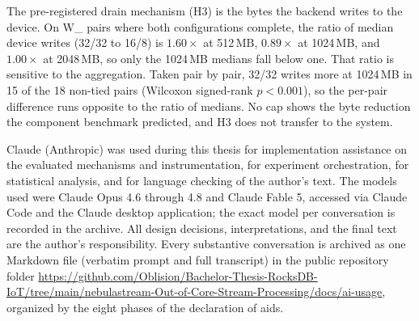 The pre-registered drain mechanism (H3) is the bytes the backend writes to the device.
On W\_ pairs where both configurations complete, the ratio of median device writes (32/32 to 16/8) is $1.60\times$ at 512\,MB, $0.89\times$ at 1024\,MB, and $1.00\times$ at 2048\,MB, so only the 1024\,MB medians fall below one.
That ratio is sensitive to the aggregation.
Taken pair by pair, 32/32 writes more at 1024\,MB in 15 of the 18 non-tied pairs (Wilcoxon signed-rank $p < 0.001$), so the per-pair difference runs opposite to the ratio of medians.
No cap shows the byte reduction the component benchmark predicted, and H3 does not transfer to the system.


Claude (Anthropic) was used during this thesis for implementation assistance on the evaluated mechanisms and instrumentation, for experiment orchestration, for statistical analysis, and for language checking of the author's text.
The models used were Claude Opus 4.6 through 4.8 and Claude Fable 5, accessed via Claude Code and the Claude desktop application; the exact model per conversation is recorded in the archive.
All design decisions, interpretations, and the final text are the author's responsibility.
Every substantive conversation is archived as one Markdown file (verbatim prompt and full transcript) in the public repository folder \url{https://github.com/Oblision/Bachelor-Thesis-RocksDB-IoT/tree/main/nebulastream-Out-of-Core-Stream-Processing/docs/ai-usage}, organized by the eight phases of the declaration of aids.
